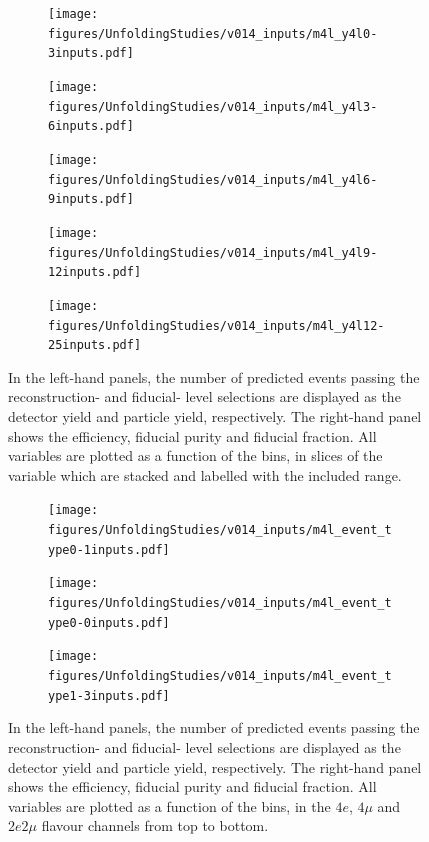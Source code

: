 \begin{figure}[htb]
    \centering 
    \begin{subfigure}{.99\textwidth}\centering
      \texttt{[image: figures/UnfoldingStudies/v014\_inputs/m4l\_y4l0-3inputs.pdf]}
    \end{subfigure}
    \begin{subfigure}{.99\textwidth}\centering
      \texttt{[image: figures/UnfoldingStudies/v014\_inputs/m4l\_y4l3-6inputs.pdf]}
    \end{subfigure}
    \begin{subfigure}{.99\textwidth}\centering
      \texttt{[image: figures/UnfoldingStudies/v014\_inputs/m4l\_y4l6-9inputs.pdf]}
    \end{subfigure}
    \begin{subfigure}{.99\textwidth}\centering
      \texttt{[image: figures/UnfoldingStudies/v014\_inputs/m4l\_y4l9-12inputs.pdf]}
    \end{subfigure}
    \begin{subfigure}{.99\textwidth}\centering
      \texttt{[image: figures/UnfoldingStudies/v014\_inputs/m4l\_y4l12-25inputs.pdf]}
    \end{subfigure}
    \caption{In the left-hand panels, the number of predicted events passing the reconstruction- and fiducial- level selections are displayed as the detector yield and particle yield, respectively. The right-hand panel shows the efficiency, fiducial purity and fiducial fraction. All variables are plotted as a function of the \mFourL bins, in slices of the \yFourL variable which are stacked and labelled with the included \yFourL range.
    \label{fig:y4lunf}}
\end{figure}  

\FloatBarrier
\clearpage

\begin{figure}[htb]
    \centering 
    \begin{subfigure}{.99\textwidth}\centering
        \texttt{[image: figures/UnfoldingStudies/v014\_inputs/m4l\_event\_type0-1inputs.pdf]}
    \end{subfigure}
    \begin{subfigure}{.99\textwidth}\centering
        \texttt{[image: figures/UnfoldingStudies/v014\_inputs/m4l\_event\_type0-0inputs.pdf]}
    \end{subfigure}
    \begin{subfigure}{.99\textwidth}\centering
        \texttt{[image: figures/UnfoldingStudies/v014\_inputs/m4l\_event\_type1-3inputs.pdf]}
    \end{subfigure}
    \caption{In the left-hand panels, the number of predicted events passing the reconstruction- and fiducial- level selections are displayed as the detector yield and particle yield, respectively. The right-hand panel shows the efficiency, fiducial purity and fiducial fraction. All variables are plotted as a function of the \mFourL bins, in the $4e$, $4\mu$ and $2e2\mu$ flavour channels from top to bottom.
    \label{fig:chunf}}
\end{figure}  

